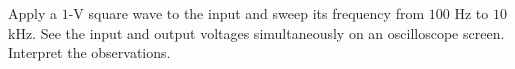 \documentclass[11pt]{article}
\begin{document}
\begin{question}
    \begin{subquestion}{Apply a $1$-V square wave to the input and sweep its frequency from $100$ Hz to $10$ kHz. See the input and output voltages simultaneously on an oscilloscope screen. Interpret the observations.}
\end{subquestion}
\end{question}
\end{document}
